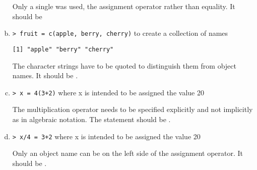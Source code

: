 \begin{enumerate}[(a)]
\TextEntry

\begin{AnswerText}
Only a single \code{=} was used, the assignment operator rather than equality.  It should be 
\end{AnswerText}


\item \verb|> fruit = c(apple, berry, cherry)| to create
a collection of names 
\begin{verbatim}
[1] "apple" "berry" "cherry"
\end{verbatim}

\TextEntry

\begin{AnswerText}
The character strings have to be quoted to distinguish them from object names.  It should be .
\end{AnswerText}


\item \verb|> x = 4(3+2)| where x is intended to be assigned the value 20

\TextEntry

\begin{AnswerText}
The multiplication operator needs to be specified explicitly and not implicitly as in algebraic notation.  The statement should be .
\end{AnswerText}



\item \verb|> x/4 = 3+2| where x is intended to be assigned the value 20

\TextEntry

\begin{AnswerText}
Only an object name can be on the left side of the assignment operator.  It should be .
\end{AnswerText}


\end{enumerate}


